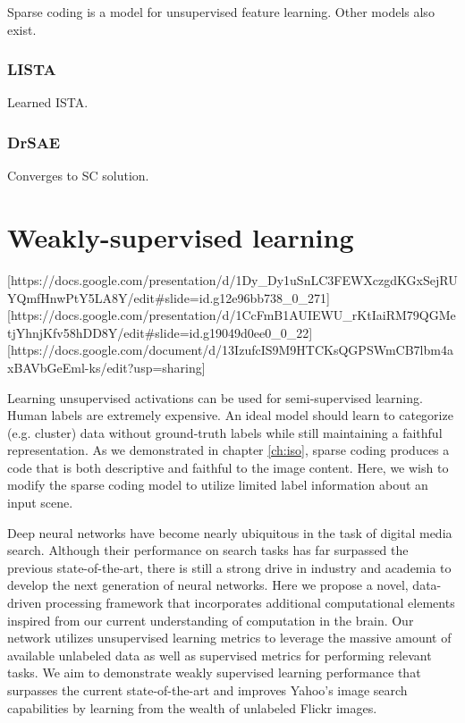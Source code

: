 Sparse coding is a model for unsupervised feature learning. Other models also exist.


\subsubsection{LISTA}
Learned ISTA.


\subsubsection{DrSAE}
Converges to SC solution.


\section{Weakly-supervised learning}
[https://docs.google.com/presentation/d/1Dy_Dy1uSnLC3FEWXczgdKGxSejRUYQmfHnwPtY5LA8Y/edit#slide=id.g12e96bb738_0_271]
[https://docs.google.com/presentation/d/1CcFmB1AUIEWU_rKtIaiRM79QGMetjYhnjKfv58hDD8Y/edit#slide=id.g19049d0ee0_0_22]
[https://docs.google.com/document/d/13IzufcIS9M9HTCKsQGPSWmCB7lbm4axBAVbGeEml-ks/edit?usp=sharing]

Learning unsupervised activations can be used for semi-supervised learning. Human labels are extremely expensive. An ideal model should learn to categorize (e.g. cluster) data without ground-truth labels while still maintaining a faithful representation. As we demonstrated in chapter \ref{ch:iso}, sparse coding produces a code that is both descriptive and faithful to the image content. Here, we wish to modify the sparse coding model to utilize limited label information about an input scene.

Deep neural networks have become nearly ubiquitous in the task of digital media search. Although their performance on search tasks has far surpassed the previous state-of-the-art, there is still a strong drive in industry and academia to develop the next generation of neural networks. Here we propose a novel, data-driven processing framework that incorporates additional computational elements inspired from our current understanding of computation in the brain. Our network utilizes unsupervised learning metrics to leverage the massive amount of available unlabeled data as well as supervised metrics for performing relevant tasks. We aim to demonstrate weakly supervised learning performance that surpasses the current state-of-the-art and improves Yahoo’s image search capabilities by learning from the wealth of unlabeled Flickr images.


